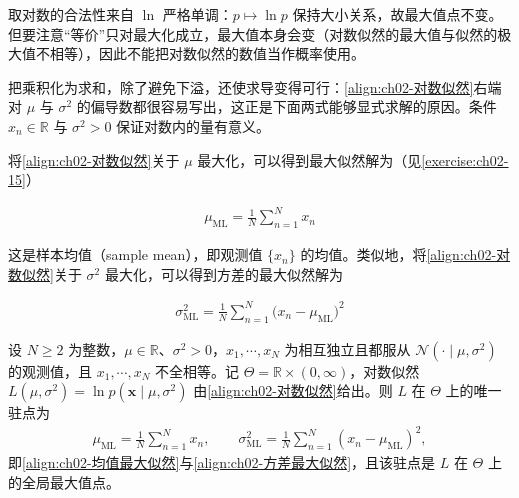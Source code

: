 \documentclass[../../main.tex]{subfiles}
\begin{document}
\begin{remark}
取对数的合法性来自 $\ln$ 严格单调：$p\mapsto\ln p$ 保持大小关系，故最大值点不变。但要注意“等价”只对最大化成立，最大值本身会变（对数似然的最大值与似然的极大值不相等），因此不能把对数似然的数值当作概率使用。

把乘积化为求和，除了避免下溢，还使求导变得可行：\eqref{align:ch02-对数似然}右端对 $\mu$ 与 $\sigma^{2}$ 的偏导数都很容易写出，这正是下面两式能够显式求解的原因。条件 $x_n\in\mathbb{R}$ 与 $\sigma^{2}>0$ 保证对数内的量有意义。
\end{remark}

将\eqref{align:ch02-对数似然}关于 $\mu$ 最大化，可以得到最大似然解为（见\cref{exercise:ch02-15}）

\begin{align}
  \mu_{\mathrm{ML}} = \frac{1}{N}\sum_{n=1}^{N} x_n
  \label{align:ch02-均值最大似然}
\end{align}

这是样本均值（sample mean），即观测值 $\{x_n\}$ 的均值。类似地，将\eqref{align:ch02-对数似然}关于 $\sigma^{2}$ 最大化，可以得到方差的最大似然解为

\begin{align}
  \sigma_{\mathrm{ML}}^{2} = \frac{1}{N}\sum_{n=1}^{N}\big(x_n-\mu_{\mathrm{ML}}\big)^{2}
  \label{align:ch02-方差最大似然}
\end{align}

\begin{theorem}\label{theorem:ch02-Gauss最大似然}
设 $N\geqslant2$ 为整数，$\mu\in\mathbb{R}$、$\sigma^{2}>0$，$x_1,\cdots,x_N$ 为相互独立且都服从 $\mathcal{N}(\cdot\mid\mu,\sigma^{2})$ 的观测值，且 $x_1,\cdots,x_N$ 不全相等。记 $\Theta=\mathbb{R}\times(0,\infty)$，对数似然 $L(\mu,\sigma^{2})=\ln p(\mathbf{x}\mid\mu,\sigma^{2})$ 由\eqref{align:ch02-对数似然}给出。则 $L$ 在 $\Theta$ 上的唯一驻点为
\begin{align*}
  \mu_{\mathrm{ML}}=\frac{1}{N}\sum_{n=1}^{N}x_n,\qquad
  \sigma_{\mathrm{ML}}^{2}=\frac{1}{N}\sum_{n=1}^{N}(x_n-\mu_{\mathrm{ML}})^{2},
\end{align*}
即\eqref{align:ch02-均值最大似然}与\eqref{align:ch02-方差最大似然}，且该驻点是 $L$ 在 $\Theta$ 上的全局最大值点。
\end{theorem}
\end{document}
